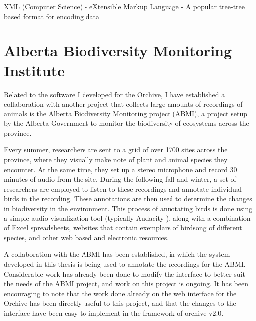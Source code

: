 \documentclass[12pt,oneside]{book}
\begin{document}
XML (Computer Science) - eXtensible Markup Language - A popular
tree-tree based format for encoding data\\












\chapter{Alberta Biodiversity Monitoring Institute}
\label{chap:ABMI}

Related to the software I developed for the Orchive, I have
established a collaboration with another project that collects large
amounts of recordings of animals is the Alberta Biodiversity
Monitoring project (ABMI), a project setup by the Alberta Government
to monitor the biodiversity of ecosystems across the province.

Every summer, researchers are sent to a grid of over 1700 sites across
the province, where they visually make note of plant and animal
species they encounter.  At the same time, they set up a stereo
microphone and record 30 minutes of audio from the site.  During the
following fall and winter, a set of researchers are employed to listen
to these recordings and annotate individual birds in the recording.
These annotations are then used to determine the changes in
biodiversity in the environment.  This process of annotating birds is
done using a simple audio visualization tool (typically Audacity
\cite{li2006auacity}), along with a combination of Excel spreadsheets,
websites that contain exemplars of birdsong of different species, and
other web based and electronic resources.

A collaboration with the ABMI has been established, in which the
system developed in this thesis is being used to annotate the
recordings for the ABMI.  Considerable work has already been done to
modify the interface to better suit the needs of the ABMI project, and
work on this project is ongoing.  It has been encouraging to note that
the work done already on the web interface for the Orchive has been
directly useful to this project, and that the changes to the interface
have been easy to implement in the framework of orchive v2.0.
\end{document}

